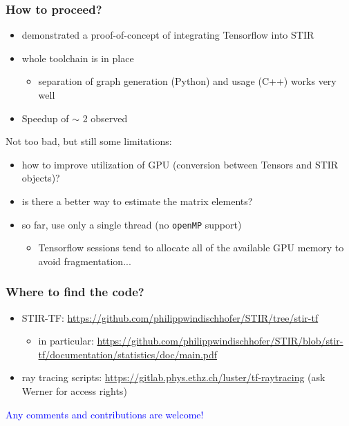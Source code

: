\documentclass{beamer}
\begin{document}
\begin{frame}
  \frametitle{How to proceed?}
  \begin{itemize}
    \item demonstrated a proof-of-concept of integrating Tensorflow into STIR
    \item whole toolchain is in place
      \begin{itemize}
        \item separation of graph generation (Python) and usage (C++) works very well
      \end{itemize}
    \item Speedup of $\sim$ 2 observed
  \end{itemize}

  Not too bad, but still some limitations:
  \begin{itemize}
    \item how to improve utilization of GPU (conversion between Tensors and STIR objects)?
    \item is there a better way to estimate the matrix elements?
    \item so far, use only a single thread (no \texttt{openMP} support)
      \begin{itemize}
        \item Tensorflow sessions tend to allocate all of the available GPU memory to avoid fragmentation...
      \end{itemize}
  \end{itemize}
\end{frame}

\begin{frame}
  \frametitle{Where to find the code?}
  \begin{itemize}
    \item STIR-TF: \url{https://github.com/philippwindischhofer/STIR/tree/stir-tf}
      \begin{itemize}
        \item in particular: \url{https://github.com/philippwindischhofer/STIR/blob/stir-tf/documentation/statistics/doc/main.pdf}
      \end{itemize}
    \item ray tracing scripts: \url{https://gitlab.phys.ethz.ch/luster/tf-raytracing} (ask Werner for access rights)
  \end{itemize}

  \begin{center}
    \textcolor{blue}{Any comments and contributions are welcome!}
  \end{center}
\end{frame}
\end{document}
